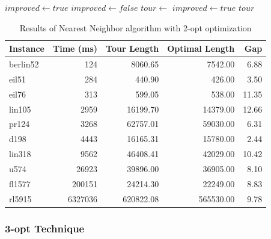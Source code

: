 \begin{algorithm}
	\caption{2-opt Technique for \Gls{TSP}}\label{alg:twoopt}
	\begin{algorithmic}[1]
		\State $improved \gets true$
		\State $improved \gets false$
		\State $tour \gets$ 
		\State $improved \gets true$
		\EndIf
		\EndFor
		\EndFor
		\EndWhile
		\State \Return $tour$
		\EndProcedure
	\end{algorithmic}
\end{algorithm}


\begin{table}
	\centering
	\caption{Results of Nearest Neighbor algorithm with 2-opt optimization}
	\begin{tabular}{lrrrr}
		\toprule
		Instance  & Time (ms) & Tour Length & Optimal Length & Gap   \\
		\midrule
		berlin52 & 124        & 8060.65        & 7542.00          & 6.88  \\
		eil51    & 284        & 440.90         & 426.00           & 3.50  \\
		eil76    & 313        & 599.05         & 538.00           & 11.35 \\
		lin105   & 2959       & 16199.70       & 14379.00         & 12.66 \\
		pr124    & 3268       & 62757.01       & 59030.00         & 6.31  \\
		d198     & 4443       & 16165.31       & 15780.00         & 2.44  \\
		lin318   & 9562       & 46408.41       & 42029.00         & 10.42 \\
		u574     & 26923      & 39896.00       & 36905.00         & 8.10  \\
		fl1577   & 200151     & 24214.30       & 22249.00         & 8.83  \\
		rl5915   & 6327036    & 620822.08      & 565530.00        & 9.78  \\
		\bottomrule
	\end{tabular}
\end{table}


\subsubsection{3-opt Technique}

